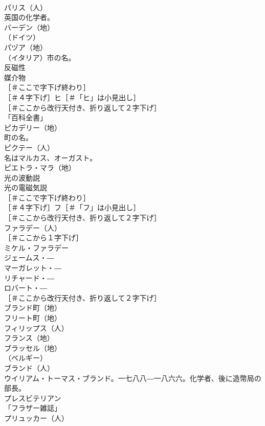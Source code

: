 \documentclass[8pt]{extreport}
\begin{document}
\begin{CJK}{UTF8}{min}
\\	パリス（人）
\\	英国の化学者。
\\	バーデン（地）
\\	（ドイツ）
\\	パヅア（地）
\\	（イタリア）市の名。
\\	反磁性 
\\	媒介物 
\\	［＃ここで字下げ終わり］
\\	［＃４字下げ］ヒ［＃「ヒ」は小見出し］
\\	［＃ここから改行天付き、折り返して２字下げ］
\\	「百科全書」 
\\	ピカデリー（地）
\\	町の名。
\\	ピクテー（人）
\\	名はマルカス、オーガスト。
\\	ピエトラ・マラ（地）
\\	光の波動説 
\\	光の電磁気説 
\\	［＃ここで字下げ終わり］
\\	［＃４字下げ］フ［＃「フ」は小見出し］
\\	［＃ここから改行天付き、折り返して２字下げ］
\\	ファラデー（人）
\\	［＃ここから１字下げ］
\\	ミケル・ファラデー 
\\	ジェームス・― 
\\	マーガレット・― 
\\	リチャード・― 
\\	ロバート・― 
\\	［＃ここから改行天付き、折り返して２字下げ］
\\	ブランド町（地）
\\	フリート町（地）
\\	フィリップス（人）
\\	フランス（地）
\\	ブラッセル（地）
\\	（ベルギー）
\\	ブランド（人）
\\	ウイリアム・トーマス・ブランド。一七八八―一八六六。化学者、後に造幣局の部長。
\\	プレスビテリアン 
\\	「フラザー雑誌」
\\	プリュッカー（人）

\end{CJK}
\end{document}
